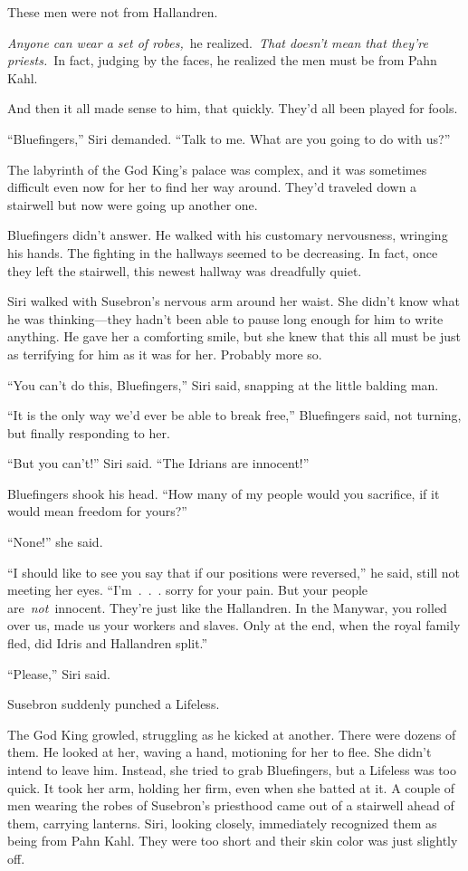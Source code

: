 These men were not from Hallandren.

\textit{Anyone can wear a set of robes,}~he realized.~\textit{That doesn’t mean that they’re priests.}~In fact, judging by the faces, he realized the men must be from Pahn Kahl.

And then it all made sense to him, that quickly. They’d all been played for fools.

\orn

“Bluefingers,” Siri demanded. “Talk to me. What are you going to do with us?”

The labyrinth of the God King’s palace was complex, and it was sometimes difficult even now for her to find her way around. They’d traveled down a stairwell but now were going up another one.

Bluefingers didn’t answer. He walked with his customary nervousness, wringing his hands. The fighting in the hallways seemed to be decreasing. In fact, once they left the stairwell, this newest hallway was dreadfully quiet.

Siri walked with Susebron’s nervous arm around her waist. She didn’t know what he was thinking—they hadn’t been able to pause long enough for him to write anything. He gave her a comforting smile, but she knew that this all must be just as terrifying for him as it was for her. Probably more so.

“You can’t do this, Bluefingers,” Siri said, snapping at the little balding man.

“It is the only way we’d ever be able to break free,” Bluefingers said, not turning, but finally responding to her.

“But you can’t!” Siri said. “The Idrians are innocent!”

Bluefingers shook his head. “How many of my people would you sacrifice, if it would mean freedom for yours?”

“None!” she said.

“I should like to see you say that if our positions were reversed,” he said, still not meeting her eyes. “I’m~.~.~. sorry for your pain. But your people are~\textit{not}~innocent. They’re just like the Hallandren. In the Manywar, you rolled over us, made us your workers and slaves. Only at the end, when the royal family fled, did Idris and Hallandren split.”

“Please,” Siri said.

Susebron suddenly punched a Lifeless.

The God King growled, struggling as he kicked at another. There were dozens of them. He looked at her, waving a hand, motioning for her to flee. She didn’t intend to leave him. Instead, she tried to grab Bluefingers, but a Lifeless was too quick. It took her arm, holding her firm, even when she batted at it. A couple of men wearing the robes of Susebron’s priesthood came out of a stairwell ahead of them, carrying lanterns. Siri, looking closely, immediately recognized them as being from Pahn Kahl. They were too short and their skin color was just slightly off.

